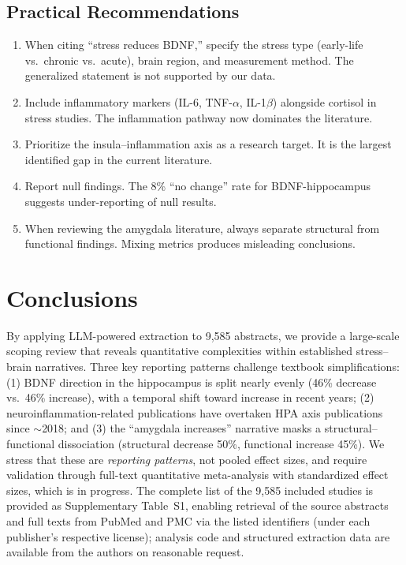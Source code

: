 \documentclass[12pt,a4paper]{article}
\begin{document}
\subsection{Practical Recommendations}

\begin{enumerate}
    \item When citing ``stress reduces BDNF,'' specify the stress type (early-life vs.\ chronic vs.\ acute), brain region, and measurement method. The generalized statement is not supported by our data.
    \item Include inflammatory markers (IL-6, TNF-$\alpha$, IL-1$\beta$) alongside cortisol in stress studies. The inflammation pathway now dominates the literature.
    \item Prioritize the insula--inflammation axis as a research target. It is the largest identified gap in the current literature.
    \item Report null findings. The 8\% ``no change'' rate for BDNF-hippocampus suggests under-reporting of null results.
    \item When reviewing the amygdala literature, always separate structural from functional findings. Mixing metrics produces misleading conclusions.
\end{enumerate}

\section{Conclusions}

By applying LLM-powered extraction to 9,585 abstracts, we provide a large-scale scoping review that reveals quantitative complexities within established stress--brain narratives. Three key reporting patterns challenge textbook simplifications: (1) BDNF direction in the hippocampus is split nearly evenly (46\% decrease vs.\ 46\% increase), with a temporal shift toward increase in recent years; (2) neuroinflammation-related publications have overtaken HPA axis publications since $\sim$2018; and (3) the ``amygdala increases'' narrative masks a structural--functional dissociation (structural decrease 50\%, functional increase 45\%). We stress that these are \textit{reporting patterns}, not pooled effect sizes, and require validation through full-text quantitative meta-analysis with standardized effect sizes, which is in progress. The complete list of the 9,585 included studies is provided as Supplementary Table~S1, enabling retrieval of the source abstracts and full texts from PubMed and PMC via the listed identifiers (under each publisher's respective license); analysis code and structured extraction data are available from the authors on reasonable request.
\end{document}
